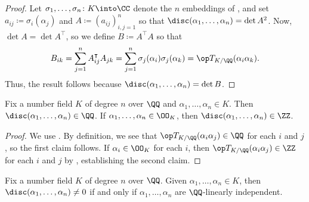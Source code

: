 \documentclass[../notes.tex]{subfiles}
\begin{document}
\begin{proof}
	Let $\sigma_1,\ldots,\sigma_n\colon K\into\CC$ denote the $n$ embeddings of , and set $a_{ij}\coloneqq\sigma_i(\alpha_j)$ and $A\coloneqq(a_{ij})_{i,j=1}^n$ so that $\disc(\alpha_1,\ldots,\alpha_n)=\det A^2$. Now, $\det A=\det A^\intercal$, so we define $B\coloneqq A^\intercal A$ so that
	\[B_{ik}=\sum_{j=1}^nA_{ij}^\intercal A_{jk}=\sum_{j=1}^n\sigma_j(\alpha_i)\sigma_j(\alpha_k)=\op T_{K/\QQ}(\alpha_i\alpha_k).\]
	Thus, the result follows because $\disc(\alpha_1,\ldots,\alpha_n)=\det B$.
\end{proof}
\begin{corollary} \label{cor:disc-is-z}
	Fix a number field $K$ of degree $n$ over $\QQ$ and $\alpha_1,\ldots,\alpha_n\in K$. Then $\disc(\alpha_1,\ldots,\alpha_n)\in\QQ$. If $\alpha_1,\ldots,\alpha_n\in\OO_K$, then $\disc(\alpha_1,\ldots,\alpha_n)\in\ZZ$.
\end{corollary}
\begin{proof}
	We use . By definition, we see that $\op T_{K/\QQ}(\alpha_i\alpha_j)\in\QQ$ for each $i$ and $j$, so the first claim follows. If $\alpha_i\in\OO_K$ for each $i$, then $\op T_{K/\QQ}(\alpha_i\alpha_j)\in\ZZ$ for each $i$ and $j$ by , establishing the second claim.
\end{proof}
\begin{proposition} \label{prop:disc-nonzero}
	Fix a number field $K$ of degree $n$ over $\QQ$. Given $\alpha_1,\ldots,\alpha_n\in K$, then $\disc(\alpha_1,\ldots,\alpha_n)\ne0$ if and only if $\alpha_1,\ldots,\alpha_n$ are $\QQ$-linearly independent.
\end{proposition}
\end{document}
